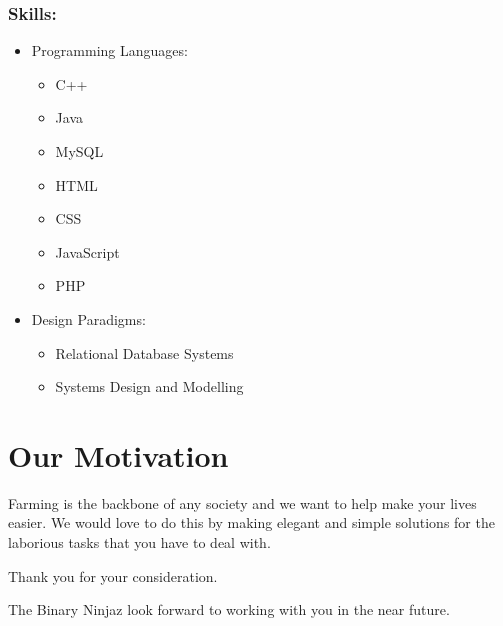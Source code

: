\documentclass[12pt]{article}
\begin{document}
	\subsubsection{Skills:}
	\begin{itemize}
	\item Programming Languages:
	\begin{itemize}
	\item C++
	\item Java
	\item MySQL
	\item HTML
	\item CSS
	\item JavaScript
	\item PHP
	\end{itemize}
	\item Design Paradigms:
	\begin{itemize}
	\item Relational Database Systems
	\item Systems Design and Modelling
	\end{itemize}
	\end{itemize}
	
	\section{Our Motivation}
	Farming is the backbone of any society and we want to help make your lives easier. We would love to do this by making elegant and simple solutions for the laborious tasks that you have to deal with.
	
	\newpage
	
	\begin{center}
	{\Huge Thank you for your consideration.}
	\end{center}
	\begin{center}
	{\Large The Binary Ninjaz look forward to working with you in the near future.}
	\end{center}
	
\end{document}
